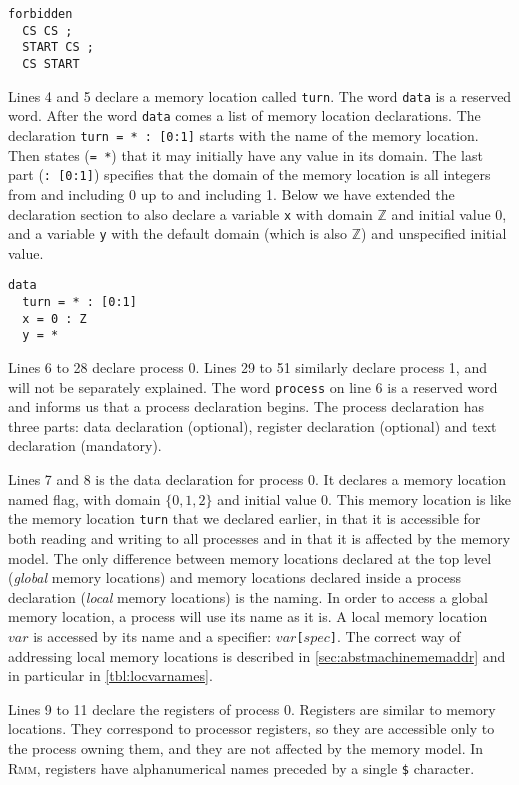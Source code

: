 \documentclass[a4paper]{article}
\newcommand{\rmm}{\textsc{Rmm}}
\begin{document}
\begin{verbatim}
forbidden
  CS CS ;
  START CS ;
  CS START
\end{verbatim}

Lines 4 and 5 declare a memory location called \verb+turn+. The word
\verb+data+ is a reserved word. After the word \verb+data+ comes a
list of memory location declarations. The declaration
\verb+turn = * : [0:1]+ starts with the name of the memory location.
Then states (\verb+= *+) that it may initially have any value in its
domain. The last part (\verb+: [0:1]+) specifies that the domain of
the memory location is all integers from and including 0 up to and
including 1. Below we have extended the declaration section to also
declare a variable \verb+x+ with domain $\mathbb{Z}$ and initial
value 0, and a variable \verb+y+ with the default domain (which is
also $\mathbb{Z}$) and unspecified initial value.

\begin{verbatim}
data
  turn = * : [0:1]
  x = 0 : Z
  y = *
\end{verbatim}

Lines 6 to 28 declare process 0. Lines 29 to 51 similarly declare
process 1, and will not be separately explained. The word
\verb+process+ on line 6 is a reserved word and informs us that a
process declaration begins. The process declaration has three parts:
data declaration (optional), register declaration (optional) and text
declaration (mandatory).

Lines 7 and 8 is the data declaration for process 0. It declares a
memory location named flag, with domain $\{0,1,2\}$ and initial value
0. This memory location is like the memory location \verb+turn+ that
we declared earlier, in that it is accessible for both reading and
writing to all processes and in that it is affected by the memory
model. The only difference between memory locations declared at the
top level (\emph{global} memory locations) and memory locations
declared inside a process declaration (\emph{local} memory locations)
is the naming. In order to access a global memory location, a process
will use its name as it is. A local memory location $var$ is accessed
by its name and a specifier: $var$\verb+[+$spec$\verb+]+. The correct
way of addressing local memory locations is described in
\cref{sec:abstmachinememaddr} and in particular in
\cref{tbl:locvarnames}.

Lines 9 to 11 declare the registers of process 0. Registers are
similar to memory locations. They correspond to processor registers,
so they are accessible only to the process owning them, and they are
not affected by the memory model. In \rmm, registers have
alphanumerical names preceded by a single \verb+$+ character.
\end{document}
